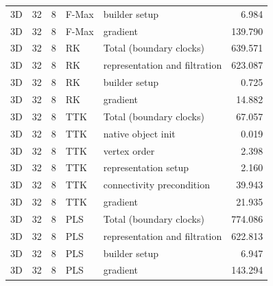 \begin{tabular}{lrrllr}
3D & 32 & 8 & F-Max & builder setup & 6.984 \\
3D & 32 & 8 & F-Max & gradient & 139.790 \\
3D & 32 & 8 & RK & Total (boundary clocks) & 639.571 \\
3D & 32 & 8 & RK & representation and filtration & 623.087 \\
3D & 32 & 8 & RK & builder setup & 0.725 \\
3D & 32 & 8 & RK & gradient & 14.882 \\
3D & 32 & 8 & TTK & Total (boundary clocks) & 67.057 \\
3D & 32 & 8 & TTK & native object init & 0.019 \\
3D & 32 & 8 & TTK & vertex order & 2.398 \\
3D & 32 & 8 & TTK & representation setup & 2.160 \\
3D & 32 & 8 & TTK & connectivity precondition & 39.943 \\
3D & 32 & 8 & TTK & gradient & 21.935 \\
3D & 32 & 8 & PLS & Total (boundary clocks) & 774.086 \\
3D & 32 & 8 & PLS & representation and filtration & 622.813 \\
3D & 32 & 8 & PLS & builder setup & 6.947 \\
3D & 32 & 8 & PLS & gradient & 143.294 \\
\hline
\end{tabular}
